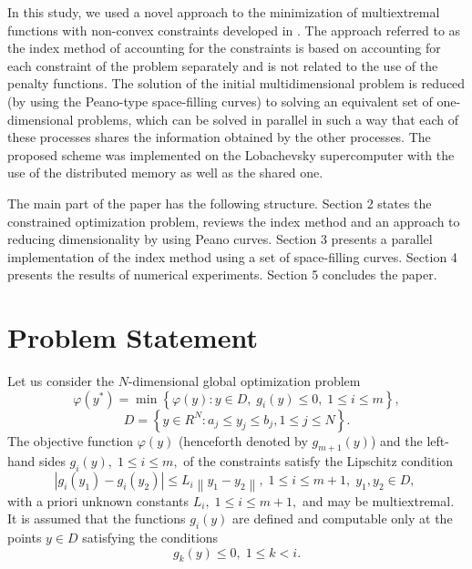 \documentclass[smallextended]{svjour3}       %
\begin{document}
In this study, we used a novel approach to the minimization of multiextremal functions with non-convex constraints developed in \cite{Strongin2000,Sergeyev2001,Barkalov2002}. The approach referred to as the index method of accounting for the constraints is based on accounting for each constraint of the problem separately and is not related to the use of the penalty functions. The solution of the initial multidimensional problem is reduced (by using the Peano-type space-filling curves) to solving an equivalent set of one-dimensional problems, which can be solved in parallel in such a way that each of these processes shares the information obtained by the other processes. The proposed scheme was implemented on the Lobachevsky supercomputer with the use of the distributed memory as well as the shared one.

The main part of the paper has the following structure. Section 2 states the constrained optimization problem, reviews the index method and an approach to reducing dimensionality by using Peano curves. Section 3 presents a parallel implementation of the index method using a set of space-filling curves. Section 4 presents the results of numerical experiments. Section 5 concludes the paper.


\section{Problem Statement}
\label{sec:2}

Let us consider the $N$-dimensional global optimization problem
\begin{equation}\label{problem}
\varphi(y^\ast)=\min{\left\{\varphi(y):y\in D, \; g_i(y)\leq 0, \; 1 \leq i \leq m\right\}},
\end{equation}
\begin{equation}\label{D}
D=\left\{y\in R^N: a_j\leq y_j \leq b_j, 1\leq j \leq N \right\}.
\end{equation}
The objective function $\varphi(y)$ (henceforth denoted by $g_{m+1}(y)$) and the left-hand sides $g_i(y), \; 1\leq i \leq m,$ of the constraints satisfy the Lipschitz condition 
\[
\left|g_i(y_1)-g_i(y_2)\right|\leq L_i\left\|y_1-y_2\right\|, \;1\leq i\leq m+1, \; y_1,y_2 \in D,\;
\]
with a priori unknown constants $L_i, \; 1 \leq i \leq m+1,$ and may be multiextremal. It is assumed that the functions $g_i(y)$ are defined and computable only at the points $y \in D$ satisfying the conditions
\begin{equation}\label{g_k}
g_k(y) \leq 0, \; 1 \leq k < i.
\end{equation}
\end{document}
